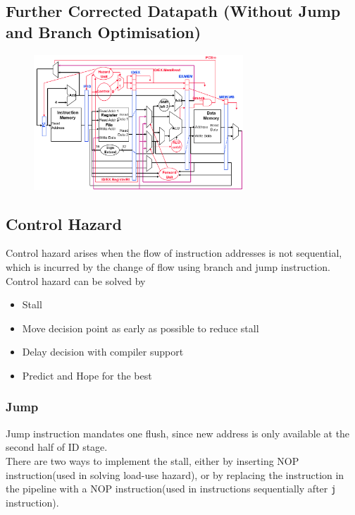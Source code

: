 \documentclass[12pt]{article}
\theoremstyle{definition}
\begin{document}
\subsection{Further Corrected Datapath (Without Jump and Branch Optimisation)}
\begin{figure}[h]
\centering
\includegraphics[width = 0.7\textwidth]{13_5.png}
\end{figure}
\subsection{Control Hazard}
Control hazard arises when the flow of instruction addresses is not sequential, which is incurred by the change of flow using branch and jump instruction.\\
Control hazard can be solved by
\begin{itemize}
  \item Stall
  \item Move decision point as early as possible to reduce stall
  \item Delay decision with compiler support
  \item Predict and Hope for the best
\end{itemize}
\subsubsection{Jump}
Jump instruction mandates one flush, since new address is only available at the second half of ID stage.\\
There are two ways to implement the stall, either by inserting NOP instruction(used in solving load-use hazard), or by replacing the instruction in the pipeline with a NOP instruction(used in instructions sequentially after \texttt{j} instruction).
\end{document}
